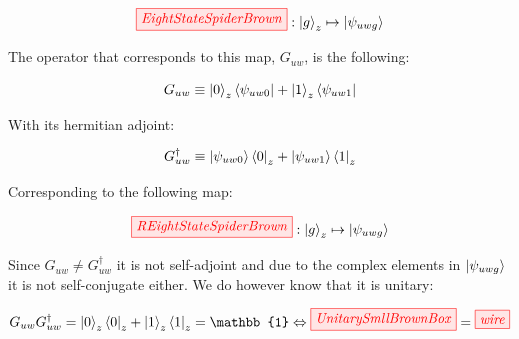 \documentclass[]{article}
\begin{document}
\begin{equation}
\tikzfig{EightStateSpiderBrown} :
\ket{g}_z \mapsto \ket{\psi_{uwg}}
\end{equation}

The operator that corresponds to this map, $G_{uw}$, is the following:

\begin{equation}
	G_{uw} \equiv \ket{0}_z\bra{\psi_{uw0}} + \ket{1}_z\bra{\psi_{uw1}}
\end{equation}

With its hermitian adjoint:

\begin{equation}
G_{uw}^\dagger \equiv \ket{\psi_{uw0}}\bra{0}_z + \ket{\psi_{uw1}}\bra{1}_z
\end{equation}

Corresponding to the following map:

\begin{equation}
\tikzfig{REightStateSpiderBrown} :
\ket{g}_z \mapsto \ket{\psi_{uwg}}
\end{equation}

Since $G_{uw} \neq G_{uw}^\dagger$ it is not self-adjoint and due to the complex elements in $\ket{\psi_{uwg}}$ it is not self-conjugate either. We do however know that it is unitary:

\begin{equation}
	G_{uw}G_{uw}^\dagger = \ket{0}_z\bra{0}_z + \ket{1}_z\bra{1}_z = \mathbb{1} \Leftrightarrow \tikzfig{UnitarySmllBrownBox} = \tikzfig{wire}
\end{equation}
\end{document}
